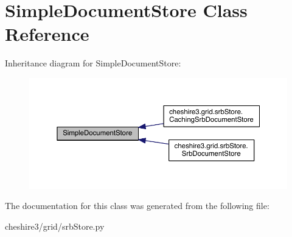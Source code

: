 \hypertarget{class_simple_document_store}{\section{Simple\-Document\-Store Class Reference}
\label{class_simple_document_store}
}


Inheritance diagram for Simple\-Document\-Store\-:
\nopagebreak
\begin{figure}[H]
\begin{center}
\leavevmode
\includegraphics[width=350pt]{class_simple_document_store__inherit__graph}
\end{center}
\end{figure}


The documentation for this class was generated from the following file\-:\begin{DoxyCompactItemize}
\item 
cheshire3/grid/srb\-Store.\-py\end{DoxyCompactItemize}
